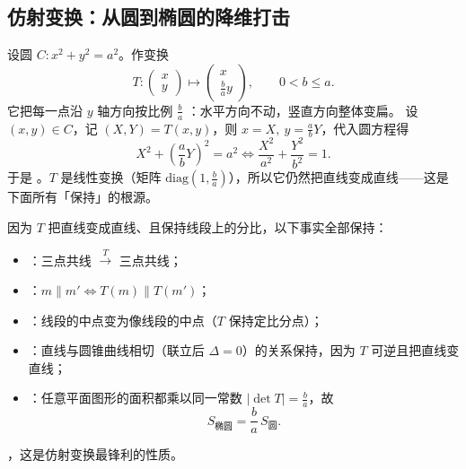 \begin{explore}

\subsection{仿射变换：从圆到椭圆的降维打击}


设圆 $C:x^2+y^2=a^2$。作变换
\[
  T:\begin{pmatrix}x\\y\end{pmatrix}\longmapsto\begin{pmatrix}x\\ \frac{b}{a}y\end{pmatrix},\qquad 0<b\le a.
\]
它把每一点沿 $y$ 轴方向按比例 $\frac{b}{a}$ ：水平方向不动，竖直方向整体变扁。
设 $(x,y)\in C$，记 $(X,Y)=T(x,y)$，则 $x=X,\ y=\frac{a}{b}Y$，代入圆方程得
\[
  X^2+\left(\frac{a}{b}Y\right)^2=a^2
  \iff \frac{X^2}{a^2}+\frac{Y^2}{b^2}=1.
\]
于是 。$T$ 是线性变换（矩阵 $\mathrm{diag}\left(1,\frac{b}{a}\right)$），所以它仍然把直线变成直线——这是下面所有「保持」的根源。

因为 $T$ 把直线变成直线、且保持线段上的分比，以下事实全部保持：
\begin{itemize}
  \item {}：三点共线 $\xrightarrow{T}$ 三点共线；
  \item {}：$m\parallel m'\iff T(m)\parallel T(m')$；
  \item {}：线段的中点变为像线段的中点（$T$ 保持定比分点）；
  \item {}：直线与圆锥曲线相切（联立后 $\Delta=0$）的关系保持，因为 $T$ 可逆且把直线变直线；
  \item {}：任意平面图形的面积都乘以同一常数 $|\det T|=\frac{b}{a}$，故
  \[
    S_{\text{椭圆}}=\frac{b}{a}\,S_{\text{圆}}.
  \]
\end{itemize}
，这是仿射变换最锋利的性质。


\end{explore}
